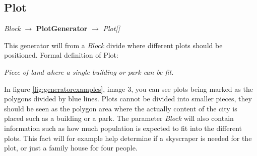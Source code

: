 \subsection{Plot}
\begin{center}
    \textit{Block} $\rightarrow$ \textbf{PlotGenerator} $\rightarrow$ \textit{Plot{[}{]}}
\end{center}
This generator will from a \textit{Block} divide where different plots should be positioned. 
Formal definition of Plot:
\begin{center}
    \textit{Piece of land where a single building or park can be fit.}
\end{center}
In figure \ref{fig:generatorexamples}, image 3, you can see plots being marked as the polygons divided by blue lines. 
Plots cannot be divided into smaller pieces, they should be seen as the polygon area where the actually content of the city is placed such as a building or a park.
The parameter \textit{Block} will also contain information such as how much population is expected to fit into the different plots. 
This fact will for example help determine if a skyscraper is needed for the plot, or just a family house for four people. 